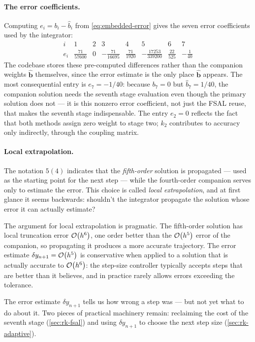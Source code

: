 \paragraph{The error coefficients.}

Computing $e_i = b_i - \hat{b}_i$ from \cref{eq:embedded-error}
gives the seven error coefficients used by the integrator:
%
\begin{equation}
  \renewcommand{\arraystretch}{1.5}
  \begin{array}{l|ccccccc}
    i & 1 & 2 & 3 & 4 & 5 & 6 & 7 \\
    \hline
    e_i & \tfrac{71}{57600} & 0 & -\tfrac{71}{16695} & \tfrac{71}{1920}
        & -\tfrac{17253}{339200} & \tfrac{22}{525} & -\tfrac{1}{40}
  \end{array}
  \label{eq:dp-error-coeffs}
\end{equation}
%
The codebase stores these pre-computed differences rather than the
companion weights $\hat{\mathbf{b}}$ themselves, since the error
estimate is the only place $\hat{\mathbf{b}}$ appears.  The most
consequential entry is $e_7 = -1/40$: because $b_7 = 0$ but
$\hat{b}_7 = 1/40$, the companion solution needs the seventh stage
evaluation even though the primary solution does not --- it is this
nonzero error coefficient, not just the FSAL reuse, that makes the
seventh stage indispensable.  The entry $e_2 = 0$ reflects the fact
that both methods assign zero weight to stage two; $k_2$
contributes to accuracy only indirectly, through the coupling matrix.

\paragraph{Local extrapolation.}

The notation $5(4)$ indicates that the \emph{fifth-order} solution is
propagated --- used as the starting point for the next step --- while
the fourth-order companion serves only to estimate the error.  This
choice is called \emph{local extrapolation}, and at first glance it
seems backwards: shouldn't the integrator propagate the solution whose
error it can actually estimate?

The argument for local extrapolation is pragmatic.  The fifth-order
solution has local truncation error $\mathcal{O}\!\left(h^6\right)$, one order better
than the $\mathcal{O}\!\left(h^5\right)$ error of the companion, so propagating it
produces a more accurate trajectory.  The error estimate
$\delta y_{n+1} = \mathcal{O}\!\left(h^5\right)$ is conservative when applied to a
solution that is actually accurate to $\mathcal{O}\!\left(h^6\right)$: the step-size
controller typically accepts steps that are better than it believes,
and in practice rarely allows errors exceeding the tolerance.

The error estimate $\delta y_{n+1}$ tells us how wrong a step was ---
but not yet what to do about it.  Two pieces of practical machinery
remain: reclaiming the cost of the seventh stage
(\cref{sec:rk-fsal}) and using $\delta y_{n+1}$ to choose the next
step size (\cref{sec:rk-adaptive}).
